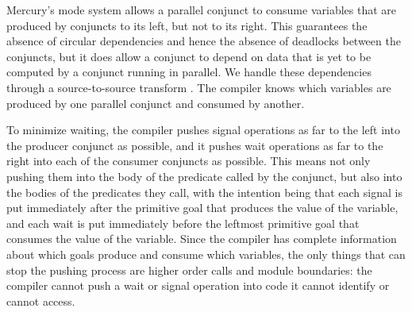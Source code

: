 Mercury's mode system allows a parallel conjunct to consume variables
that are produced by conjuncts to its left, but not to its right.
This guarantees the absence of circular dependencies
and hence the absence of deadlocks between the conjuncts,
but it does allow a conjunct to depend on data that is yet to be computed
by a conjunct running in parallel.
We handle these dependencies through a source-to-source transform
\cite{wang_dep_par_conj}.
The compiler knows which variables
are produced by one parallel conjunct and consumed by another.

To minimize waiting,
the compiler pushes signal operations
as far to the left into the producer conjunct as possible,
and it pushes wait operations
as far to the right into each of the consumer conjuncts as possible.
This means not only pushing them
into the body of the predicate called by the conjunct,
but also into the bodies of the predicates they call,
with the intention being that
each signal is put immediately after
the primitive goal that produces the value of the variable,
and each wait is put immediately before
the leftmost primitive goal that consumes the value of the variable.
Since the compiler has complete information
about which goals produce and consume which variables,
the only things that can stop the pushing process are
higher order calls and module boundaries:
the compiler cannot push a wait or signal operation
into code it cannot identify or cannot access.

